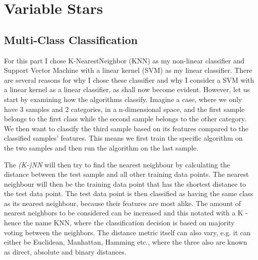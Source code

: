 \documentclass{article}
\theoremstyle{plain}
\theoremstyle{nonumberplain}
\begin{document}
\section{Variable Stars}

\subsection{Multi-Class Classification}

For this part I chose K-NearestNeighbor (KNN) as my non-linear classifier and Support Vector Machine with a linear kernel (SVM) as my linear classifier.
There are several reasons for why I chose these classifier and why I consider a SVM with a linear kernel as a linear classifier, as shall now become evident.
However, let us start by examining how the algorithms classify.
Imagine a case, where we only have 3 samples and 2 categories, in a n-dimensional space, and the first sample belongs to the first class while the second sample belongs to the other category.
We then want to classify the third sample based on its features compared to the classified samples' features. This means we first train the specific algorithm on the two samples and then run the algorithm on the last sample.

The \textit{(K-)NN} will then try to find the nearest neighbour by calculating the distance between the test sample and all other training data points. The nearest neighbour will then be the training data point that has the shortest distance to the test data point. The test data point is then classified as having the same class as its nearest neighbour, because their features are most alike.
The amount of nearest neighbors to be considered can be increased and this notated with a K - hence the name KNN, where the classification decision is based on majority voting between the neighbors. 
The distance metric itself can also vary, e.g. it can either be Euclidean, Manhattan, Hamming etc., where the three also are known as direct, absolute and binary distances.
\end{document}

